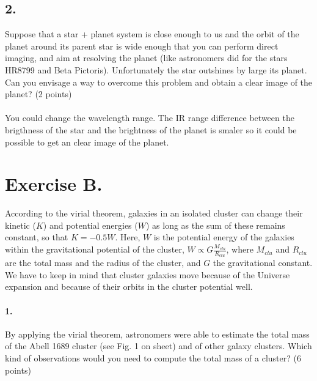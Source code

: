 \documentclass[11pt,a4paper,twoside]{article}
\begin{document}
\subsection*{2.} Suppose that a star + planet system is close enough to us and the orbit of the planet
around its parent star is wide enough that you can perform direct imaging, and aim at
resolving the planet (like astronomers did for the stars HR8799 and Beta Pictoris).
Unfortunately the star outshines by large its planet. Can you envisage a way to
overcome this problem and obtain a clear image of the planet? (2 points)\\
\\
You could change the wavelength range. The IR range difference between the brigthness of the star and the brightness of the planet is smaler so it could be possible to get an clear image of the planet.

\section*{Exercise B.}

According to the virial theorem, galaxies in an isolated cluster can change
their kinetic ($K$) and potential energies ($W$) as long as the sum of these 
remains constant, so that $K = -0.5W$. Here, $W$ is the potential energy of the 
galaxies within the gravitational potential of the cluster, $W \propto 
G \frac{M_{clu}}{R_{clu}}$, where $M_{clu}$ and $R_{clu}$ are the total mass and 
the radius of the cluster, and $G$ the gravitational constant. We have to keep 
in mind that cluster galaxies move because of the Universe expansion and 
because of their orbits in the cluster potential well. \\

\paragraph{1.} By applying the virial theorem, astronomers were able to 
estimate the total mass of the Abell 1689 cluster (see Fig. 1 on sheet) and of 
other galaxy clusters. Which kind of observations would you need to compute 
the total mass of a cluster? (6 points) \\
\end{document}
